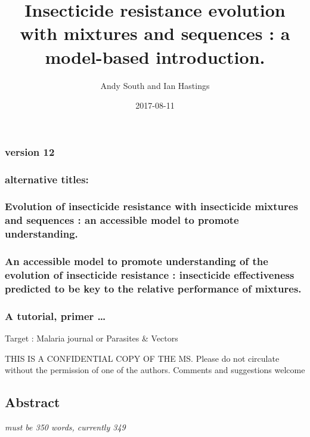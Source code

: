 \documentclass[11pt,]{article}
\title{Insecticide resistance evolution with mixtures and sequences : a
model-based introduction.}
\author{Andy South and Ian Hastings}
\date{2017-08-11}
\begin{document}
\maketitle

\subsubsection{version 12}\label{version-12}

\subsubsection{alternative titles:}\label{alternative-titles}

\subsubsection{Evolution of insecticide resistance with insecticide
mixtures and sequences : an accessible model to promote
understanding.}\label{evolution-of-insecticide-resistance-with-insecticide-mixtures-and-sequences-an-accessible-model-to-promote-understanding.}

\subsubsection{An accessible model to promote understanding of the
evolution of insecticide resistance : insecticide effectiveness
predicted to be key to the relative performance of
mixtures.}\label{an-accessible-model-to-promote-understanding-of-the-evolution-of-insecticide-resistance-insecticide-effectiveness-predicted-to-be-key-to-the-relative-performance-of-mixtures.}

\subsubsection{A tutorial, primer \ldots{}}\label{a-tutorial-primer}

Target : Malaria journal or Parasites \& Vectors

THIS IS A CONFIDENTIAL COPY OF THE MS. Please do not circulate without
the permission of one of the authors. Comments and suggestions welcome

\subsection{Abstract}\label{abstract}

\emph{must be 350 words, currently 349}
\end{document}
